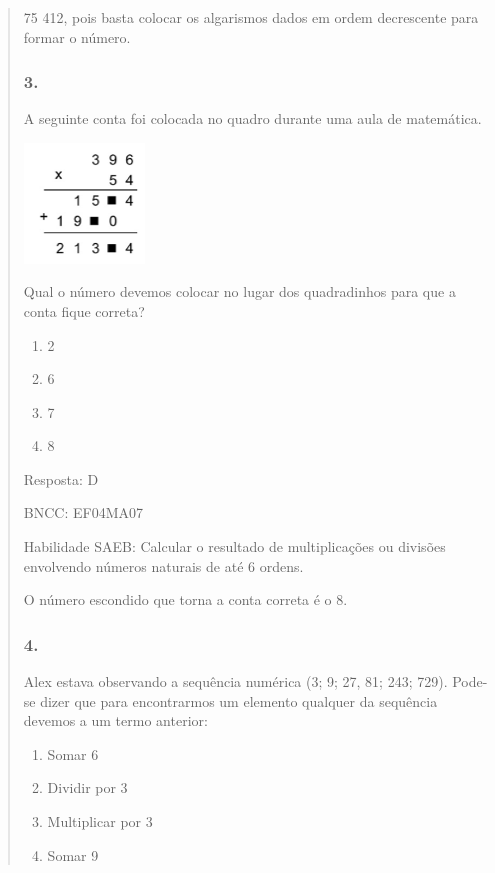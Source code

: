 \begin{enumerate}
\begin{escolha}
\begin{enumerate}
\begin{itemize}
\begin{itemize}
\begin{escolha}
\begin{quote}
\begin{escolha}
{75 412, pois basta colocar os algarismos dados em ordem decrescente para
formar o número.

\subsubsection{3.}\label{section-174}

A seguinte conta foi colocada no quadro durante uma aula de matemática.

\includegraphics[width=1.26282in,height=1.25762in]{media/image159.png}

Qual o número devemos colocar no lugar dos quadradinhos para que a conta
fique correta?

\begin{enumerate}
\def\labelenumi{\alph{enumi})}
\item
  2
\item
  6
\item
  7
\item
  8
\end{enumerate}

Resposta: D

BNCC: EF04MA07

Habilidade SAEB: Calcular o resultado de multiplicações ou divisões
envolvendo números naturais de até 6 ordens.

O número escondido que torna a conta correta é o 8.

\subsubsection{4.}\label{section-175}

Alex estava observando a sequência numérica (3; 9; 27, 81; 243; 729).
Pode-se dizer que para encontrarmos um elemento qualquer da sequência
devemos a um termo anterior:

\begin{enumerate}
\def\labelenumi{\alph{enumi})}
\item
  Somar 6
\item
  Dividir por 3
\item
  Multiplicar por 3
\item
  Somar 9
\end{enumerate}

}
\end{escolha}
\end{quote}
\end{escolha}
\end{itemize}
\end{itemize}
\end{enumerate}
\end{escolha}
\end{enumerate}
